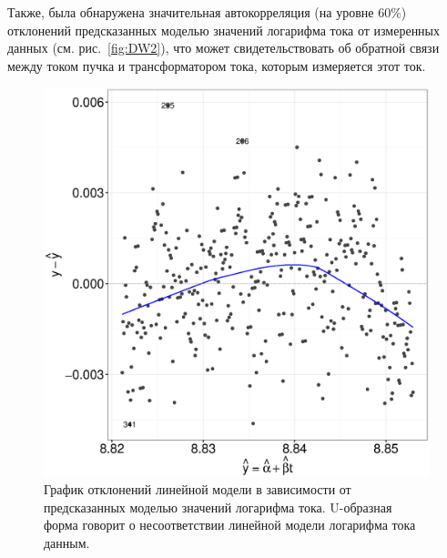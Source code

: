 \documentclass{article}
\begin{document}
	Также, была обнаружена значительная автокорреляция (на уровне 60\%) отклонений предсказанных моделью значений логарифма тока от измеренных данных (см. рис.~\ref{fig:DW2}), что может свидетельствовать об обратной связи между током пучка и трансформатором тока, которым измеряется этот ток. 
	
	\begin{figure}[h!]
		\centering
		\includegraphics[scale=.7]{Res_VS_Fit_2016-17.eps}
		\caption{График отклонений линейной модели в зависимости от предсказанных моделью значений логарифма тока. U-образная форма говорит о несоответствии линейной модели логарифма тока данным. \label{fig:res_vs_fit}}
	\end{figure}
\end{document}

